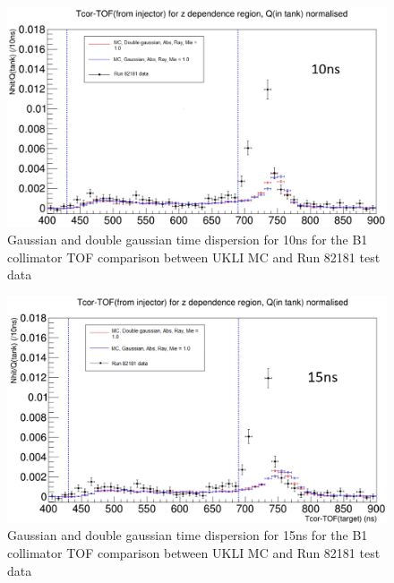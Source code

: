 \begin{figure}
    \centering
    \includegraphics[width=\textwidth]{Figures/time_dispersion_TOF_10ns.PNG}
    \caption{Gaussian and double gaussian time dispersion for 10ns for the B1 collimator TOF comparison between UKLI MC and Run 82181 test data}
    \label{fig:10ns_time_dispersion}
\end{figure}

\begin{figure}
    \centering
    \includegraphics[width=\textwidth]{Figures/time_dispersion_TOF_15ns.PNG}
    \caption{Gaussian and double gaussian time dispersion for 15ns for the B1 collimator TOF comparison between UKLI MC and Run 82181 test data}
    \label{fig:15ns_time_dispersion}
\end{figure}

